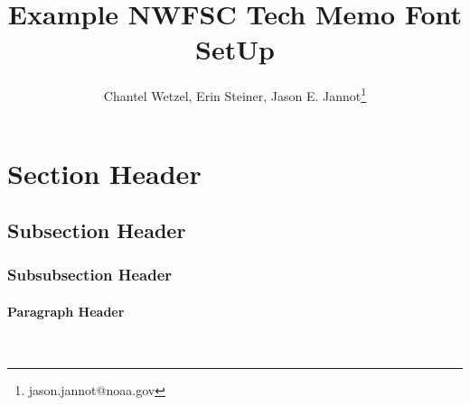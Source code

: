 \documentclass[12pt]{article}
\title{\textcolor[cmyk]{1.00,0.83,0.41,0.36}{Example NWFSC Tech Memo Font SetUp}}
\author{Chantel Wetzel, Erin Steiner, Jason E. Jannot\footnote{jason.jannot@noaa.gov}}
\newcommand{\paragraphnewline}[1]{\paragraph{#1}\mbox{}\\}
\begin{document}
\maketitle
\normalfont %
\normalsize %

\section{Section Header}
\lipsum[1]
\subsection{Subsection Header}
\lipsum[2]
\subsubsection{Subsubsection Header}
\lipsum[3]
\paragraphnewline{Paragraph Header}
\lipsum[4]
\end{document}
